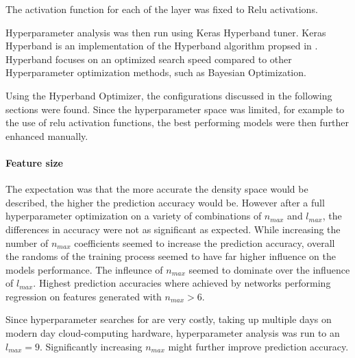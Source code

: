 The activation function for each of the layer was fixed to Relu activations.

Hyperparameter analysis was then run using Keras Hyperband tuner.
Keras Hyperband is an  implementation of the Hyperband algorithm propsed in \cite{li2017hyperband}.
Hyperband focuses on an optimized search speed compared to other Hyperparameter optimization methods, such as
Bayesian Optimization. %

Using the Hyperband Optimizer, the configurations discussed in the following sections were found.
Since the hyperparameter space was limited, for example to the use of relu activation functions,
the best performing models were then further enhanced manually.

\paragraph{Feature size}
The expectation was that the more accurate the density space would be described, the higher the prediction accuracy would be.
However after a full hyperparameter optimization on a variety of combinations of $n_{max}$ and $l_{max}$,
the differences in accuracy were not as significant as expected.
While increasing the number of $n_{max}$ coefficients seemed to increase the prediction accuracy,
overall the randoms of the training process seemed to have far higher influence on the models performance.
The infleunce of $n_{max}$ seemed to dominate over the influence of $l_{max}$.
Highest prediction accuracies where achieved by networks performing regression on features generated with $n_{max} > 6$.

Since hyperparameter searches for are very costly, taking up multiple days on modern day cloud-computing hardware,
hyperparameter analysis was run to an $l_{max} = 9$.
Significantly increasing $n_{max}$ might further improve prediction accuracy.

